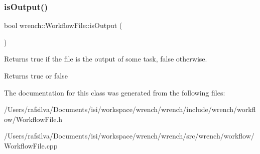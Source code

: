 \subsubsection{\texorpdfstring{is\+Output()}{isOutput()}}
{\footnotesize\ttfamily bool wrench\+::\+Workflow\+File\+::is\+Output (\begin{DoxyParamCaption}{ }\end{DoxyParamCaption})}



Returns true if the file is the output of some task, false otherwise. 

\begin{DoxyReturn}{Returns}
true or false 
\end{DoxyReturn}


The documentation for this class was generated from the following files\+:\begin{DoxyCompactItemize}
\item 
/\+Users/rafsilva/\+Documents/isi/workspace/wrench/wrench/include/wrench/workflow/Workflow\+File.\+h\item 
/\+Users/rafsilva/\+Documents/isi/workspace/wrench/wrench/src/wrench/workflow/Workflow\+File.\+cpp\end{DoxyCompactItemize}
